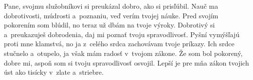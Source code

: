 Pane, svojmu služobníkovi si preukázal dobro,
ako si prisľúbil.
\versseparator
Nauč ma dobrotivosti, múdrosti a~poznaniu,
veď verím tvojej náuke.
\versseparator
Pred svojím pokorením som blúdil,
no teraz už dbám na tvoje výroky.
\versseparator
Dobrotivý si a~preukazuješ dobrodenia,
daj mi poznať tvoju spravodlivosť.
\versseparator
Pyšní vymýšľajú proti mne klamstvá,
no ja z~celého srdca zachovávam tvoje príkazy.
\versseparator
Ich srdce stučnelo a~otupelo,
ja však mám radosť v~tvojom zákone.
\versseparator
Že som bol pokorený, dobre mi,
aspoň som si tvoju spravodlivosť osvojil.
\versseparator
Lepší je pre mňa zákon tvojich úst
ako tisícky v~zlate a~striebre.